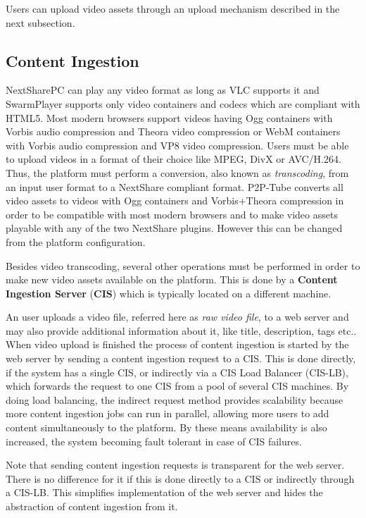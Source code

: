 Users can upload video assets through an upload mechanism described in the next subsection.

\subsection{Content Ingestion}
\label{subsec:content-ingestion}

NextSharePC can play any video format as long as VLC supports it and SwarmPlayer supports only video containers and codecs which are compliant with HTML5. Most modern browsers support videos having Ogg containers with Vorbis audio compression and Theora video compression or WebM containers with Vorbis audio compression and VP8 video compression. Users must be able to upload videos in a format of their choice like MPEG, DivX or AVC/H.264. Thus, the platform must perform a conversion, also known as \textit{transcoding}, from an input user format to a NextShare compliant format. P2P-Tube converts all video assets to videos with Ogg containers and Vorbis+Theora compression in order to be compatible with most modern browsers and to make video assets playable with any of the two NextShare plugins. However this can be changed from the platform configuration.

Besides video transcoding, several other operations must be performed in order to make new video assets available on the platform. This is done by a \textbf{Content Ingestion Server} (\textbf{CIS}) which is typically located on a different machine.

An user uploads a video file, referred here as \textit{raw video file}, to a web server and may also provide additional information about it, like title, description, tags etc.. When video upload is finished the process of content ingestion is started by the web server by sending a content ingestion request to a CIS. This is done directly, if the system has a single CIS, or indirectly via a CIS Load Balancer (CIS-LB), which forwards the request to one CIS from a pool of several CIS machines. By doing load balancing, the indirect request method provides scalability because more content ingestion jobs can run in parallel, allowing more users to add content simultaneously to the platform. By these means availability is also increased, the system becoming fault tolerant in case of CIS failures.

Note that sending content ingestion requests is transparent for the web server. There is no difference for it if this is done directly to a CIS or indirectly through a CIS-LB. This simplifies implementation of the web server and hides the abstraction of content ingestion from it.


